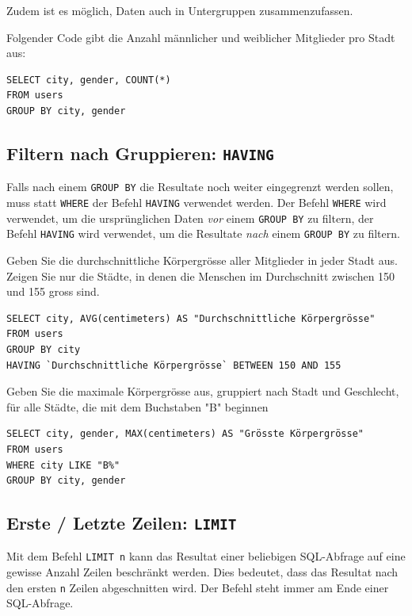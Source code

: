 Zudem ist es möglich, Daten auch in Untergruppen zusammenzufassen.

\begin{myexample}
Folgender Code gibt die Anzahl männlicher und weiblicher Mitglieder pro Stadt aus:
\begin{lstlisting}
SELECT city, gender, COUNT(*) 
FROM users 
GROUP BY city, gender
\end{lstlisting}
\end{myexample}

\subsection{Filtern nach Gruppieren: \texorpdfstring{\lstinline|HAVING|}{HAVING}}
Falls nach einem \lstinline|GROUP BY| die Resultate noch weiter eingegrenzt werden sollen, muss statt \lstinline|WHERE| der Befehl \lstinline|HAVING| verwendet werden. Der Befehl \lstinline|WHERE| wird verwendet, um die ursprünglichen Daten \textit{vor} einem \lstinline|GROUP BY| zu filtern, der Befehl \lstinline|HAVING| wird verwendet, um die Resultate \textit{nach} einem \lstinline|GROUP BY| zu filtern.

\begin{mychallenge}
  Geben Sie die durchschnittliche Körpergrösse aller Mitglieder in jeder Stadt aus. Zeigen Sie nur die Städte, in denen die Menschen im Durchschnitt zwischen 150 und 155 gross sind.
  \begin{myanswer}
    \begin{lstlisting}
SELECT city, AVG(centimeters) AS "Durchschnittliche Körpergrösse"
FROM users
GROUP BY city
HAVING `Durchschnittliche Körpergrösse` BETWEEN 150 AND 155
\end{lstlisting}
  \end{myanswer}
\end{mychallenge}

\begin{mychallenge}
  Geben Sie die maximale Körpergrösse aus, gruppiert nach Stadt und Geschlecht, für alle Städte, die mit dem Buchstaben "B" beginnen
  \begin{myanswer}
    \begin{lstlisting}
SELECT city, gender, MAX(centimeters) AS "Grösste Körpergrösse"
FROM users
WHERE city LIKE "B%"
GROUP BY city, gender
\end{lstlisting}
  \end{myanswer}
\end{mychallenge}

\subsection{Erste / Letzte Zeilen: \texorpdfstring{\lstinline|LIMIT|}{LIMIT}}
Mit dem Befehl \lstinline|LIMIT n| kann das Resultat einer beliebigen \gls{SQL}-Abfrage auf eine gewisse Anzahl Zeilen beschränkt werden. Dies bedeutet, dass das Resultat nach den ersten \texttt{n} Zeilen abgeschnitten wird. Der Befehl steht immer am Ende einer SQL-Abfrage.

